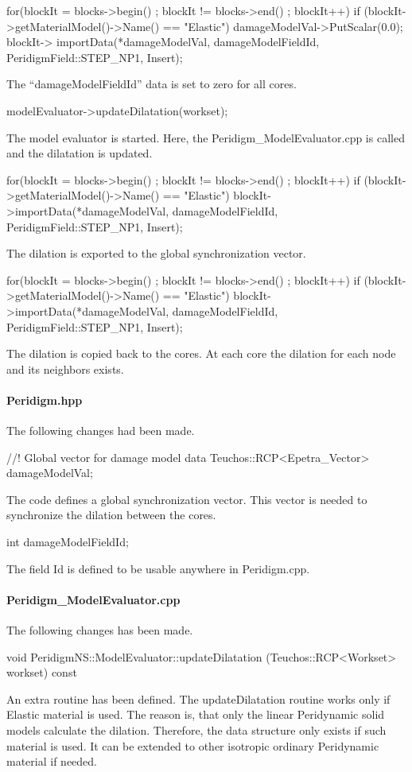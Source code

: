 \begin{code}
for(blockIt = blocks->begin() ; blockIt != blocks->end() ; blockIt++){
  if (blockIt->getMaterialModel()->Name() == "Elastic"){
     damageModelVal->PutScalar(0.0); 
     blockIt->
        importData(*damageModelVal, damageModelFieldId,
        PeridigmField::STEP_NP1, Insert);
      }
}
\end{code}
The ``damageModelFieldId'' data is set to zero for all cores.
\begin{code}
    modelEvaluator->updateDilatation(workset);
\end{code}
The model evaluator is started. Here, the Peridigm\_ModelEvaluator.cpp is called and the dilatation is updated.
\begin{code}
for(blockIt = blocks->begin() ; blockIt != blocks->end() ; blockIt++){
    if (blockIt->getMaterialModel()->Name() == "Elastic"){
      blockIt->importData(*damageModelVal, damageModelFieldId,
      PeridigmField::STEP_NP1, Insert);
    }
}
\end{code}
The dilation is exported to the global synchronization vector. 
\begin{code}
for(blockIt = blocks->begin() ; blockIt != blocks->end() ; blockIt++){
    if (blockIt->getMaterialModel()->Name() == "Elastic"){
      blockIt->importData(*damageModelVal, damageModelFieldId, 
      PeridigmField::STEP_NP1, Insert);
    }
}
\end{code}
The dilation is copied back to the cores. At each core the dilation for each node and its neighbors exists.
\paragraph{Peridigm.hpp}
The following changes had been made.
\begin{code}
//! Global vector for damage model data
Teuchos::RCP<Epetra_Vector> damageModelVal;
\end{code}
The code defines a global synchronization vector. This vector is needed to synchronize the dilation between the cores.
\begin{code}
int damageModelFieldId;
\end{code}
The field Id is defined to be usable anywhere in Peridigm.cpp.
\paragraph{Peridigm\_ModelEvaluator.cpp}
The following changes has been made.
\begin{code}
void 
PeridigmNS::ModelEvaluator::updateDilatation
  (Teuchos::RCP<Workset> workset) const
\end{code}
An extra routine has been defined. The updateDilatation routine works only if Elastic material is used. The reason is, that only the %
linear Peridynamic solid models calculate the dilation. Therefore, the data structure only exists if such material is used.
It can be extended to other isotropic ordinary Peridynamic material if needed.
